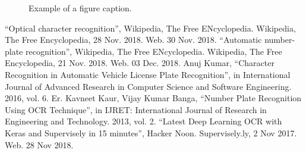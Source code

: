 \documentclass[conference]{IEEEtran}
\begin{document}
\begin{figure}[htbp]
\centerline{}
\caption{Example of a figure caption.}
\label{fig}
\end{figure}

\begin{thebibliography}{00}
 “Optical character recognition”, Wikipedia, The Free ENcyclopedia. Wikipedia, The Free Encyclopedia, 28 Nov. 2018. Web. 30 Nov. 2018.
 “Automatic number-plate recognition”, Wikipedia, The Free ENcyclopedia. Wikipedia, The Free Encyclopedia, 21 Nov. 2018. Web. 03 Dec. 2018.
 Anuj Kumar, “Character Recognition in Automatic Vehicle License Plate Recognition”, in International Journal of Advanced Research in Computer Science and Software Engineering. 2016, vol. 6.
 Er. Kavneet Kaur, Vijay Kumar Banga, “Number Plate Recognition Using OCR Technique”, in IJRET: International Journal of Research in Engineering and Technology. 2013, vol. 2.
 “Latest Deep Learning OCR with Keras and Supervisely in 15 minutes”, Hacker Noon. Supervisely.ly, 2 Nov 2017. Web. 28 Nov 2018.
\end{thebibliography}
\end{document}
